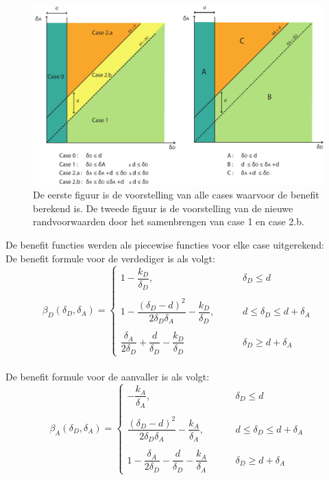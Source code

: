 \documentclass[master=cws, masteroption=vs,english]{kulemt}
\begin{document}
\begin{abstract*}
\begin{figure}[hbtp]
\centering
\includegraphics[scale=0.5]{Images/borders.pdf}
\caption{De eerste figuur is de voorstelling van alle cases waarvoor de benefit berekend is. De tweede figuur is de voorstelling van de nieuwe randvoorwaarden door het samenbrengen van case 1 en case 2.b.}
\label{grensen}
\end{figure}



De benefit functies werden als piecewise functies voor elke case uitgerekend:\\
De benefit formule voor de verdediger is als volgt:
\begin{displaymath}
\beta_{D}(\delta_{D},\delta_{A})= \left\{
\begin{array}{lll}
	1 - \dfrac{k_{D}}{\delta_{D}}, &~~~~~ & \delta_{D} \leq d \\
	~ & ~ \\
   1 - \dfrac{(\delta_{D} - d)^2}{2\delta_{D}\delta_{A}} - \dfrac{k_{D}}{\delta_{D}}, & ~~~~~~& d \leq \delta_{D} \leq d + \delta_{A} \\
   ~ & ~ \\
   \dfrac{\delta_{A}}{2\delta_{D}} + \dfrac{d}{\delta_{D}} - \dfrac{k_{D}}{\delta_{D}} &~~~~~& \delta_{D} \geq d + \delta_{A} 
\end{array}
\right.
\end{displaymath}
~~ \\
De benefit formule voor de aanvaller is als volgt:
\begin{displaymath}
\beta_{A}(\delta_{D},\delta_{A})= \left\{
\begin{array}{lll}
	 -\dfrac{k_{A}}{\delta_{A}}, & ~~~~~& \delta_{D} \leq d \\
	~ & ~ \\
   \dfrac{(\delta_{D} - d)^2}{2\delta_{D}\delta_{A}} - \dfrac{k_{A}}{\delta_{A}}, & ~~~~~~& d \leq \delta_{D} \leq d + \delta_{A} \\
   ~ & ~ \\
   1 - \dfrac{\delta_{A}}{2\delta_{D}} - \dfrac{d}{\delta_{D}} - \dfrac{k_{A}}{\delta_{A}} &~~~~~& \delta_{D} \geq d + \delta_{A} 


\end{array}
\end{displaymath}
\end{abstract*}
\end{document}
